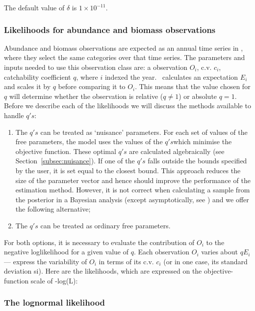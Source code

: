 The default value of $\delta$ is $1 \times 10^{-11}$.

\subsubsection{Likelihoods for abundance and biomass observations}\label{Obs:biomass}
Abundance and biomass observations are expected as an annual time series in \CNAME, where they select the same categories over that time series. The parameters and inputs needed to use this observation class are: a observation $O_i$, c.v. $c_i$, catchability coefficient $q$, where $i$ indexed the year. \CNAME\ calculates an expectation $E_i$ and scales it by $q$ before comparing it to $O_i$. This means that the value chosen for $q$ will determine whether the observation is relative ($q\neq 1$) or absolute $q = 1$. Before we describe each of the likelihoods we will discuss the methods available to handle $q's$:

\begin{enumerate}
	\item The $q's$ can be treated as ‘nuisance’ parameters. For each set of values of the free parameters, the model uses the values of the $q's$which minimise the objective function. These optimal $q's$ are calculated algebraically (see Section~\ref{subsec:nuisance}). If one of the $q's$ falls outside the bounds specified by the user, it is set equal to the closest bound. This approach reduces the size of the parameter vector and hence should improve the performance of the estimation method. However, it is not correct when calculating a sample from the posterior in a Bayesian analysis (except asymptotically, see \cite{Walters_ludwig_94}) and we offer the following alternative;
	
	\item The $q's$ can be treated as ordinary free parameters.
\end{enumerate}	
	
For both options, it is necessary to evaluate the contribution of $O_i$ to the negative loglikelihood for a given value of $q$. Each observation $O_i$ varies about $qE_i$ — express the variability of $O_i$ in terms of its c.v. $c_i$ (or in one case, its standard deviation si). Here are the likelihoods, which are expressed on the objective-function scale of -log(L):


\subsubsection*{The lognormal likelihood}

